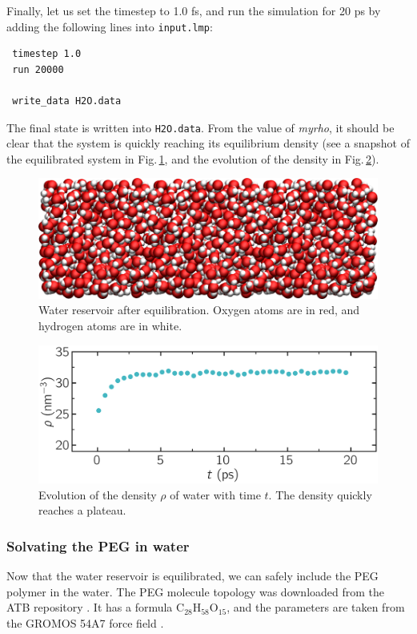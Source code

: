 \documentclass[9pt,tutorial]{livecoms}
\newcommand{\flecmd}[1]{\textcolor{command}{\texttt{#1}}} %
\begin{document}
Finally, let us set the timestep to 1.0 fs, and run the simulation for 20 ps by
adding the following lines into \flecmd{input.lmp}:
\begin{lstlisting}
 timestep 1.0
 run 20000

 write_data H2O.data
\end{lstlisting}
The final state is written into \flecmd{H2O.data}. From the value of \textit{myrho},
it should be clear that the system is quickly reaching its equilibrium
density (see a snapshot of the equilibrated system in Fig.\,\ref{fig:PEG-water},
and the evolution of the density in Fig.\,\ref{fig:PEG-density}).

\begin{figure}
\centering
\includegraphics[width=\linewidth]{PEG-water}
\caption{Water reservoir after equilibration. Oxygen atoms are in red, and hydrogen
atoms are in white.}
\label{fig:PEG-water}
\end{figure}

\begin{figure}
\centering
\includegraphics[width=\linewidth]{PEG-density}
\caption{Evolution of the density $\rho$ of water with time $t$. The density
quickly reaches a plateau.}
\label{fig:PEG-density}
\end{figure}

\subsubsection{Solvating the PEG in water}
Now that the water reservoir is equilibrated, we can safely include the PEG polymer
in the water. The PEG molecule topology was downloaded from the ATB repository
\cite{malde2011automated, oostenbrink2004biomolecular}. It has a formula
$\text{C}_{28}\text{H}_{58}\text{O}_{15}$, and the parameters are taken from
the GROMOS 54A7 force field \cite{schmid2011definition}.
\end{document}
